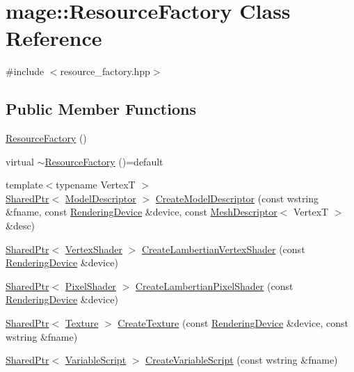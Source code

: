 \hypertarget{classmage_1_1_resource_factory}{}\section{mage\+:\+:Resource\+Factory Class Reference}
\label{classmage_1_1_resource_factory}


{\ttfamily \#include $<$resource\+\_\+factory.\+hpp$>$}

\subsection*{Public Member Functions}
\begin{DoxyCompactItemize}
\item 
\hyperlink{classmage_1_1_resource_factory_a340bde81096427e319b60063ae771a0d}{Resource\+Factory} ()
\item 
virtual \hyperlink{classmage_1_1_resource_factory_a07b50ac86226772e3c7d119ff9e10043}{$\sim$\+Resource\+Factory} ()=default
\item 
{\footnotesize template$<$typename VertexT $>$ }\\\hyperlink{namespacemage_a1e01ae66713838a7a67d30e44c67703e}{Shared\+Ptr}$<$ \hyperlink{classmage_1_1_model_descriptor}{Model\+Descriptor} $>$ \hyperlink{classmage_1_1_resource_factory_a04e226be9c659dc33d263dc82a2a1a30}{Create\+Model\+Descriptor} (const wstring \&fname, const \hyperlink{classmage_1_1_rendering_device}{Rendering\+Device} \&device, const \hyperlink{structmage_1_1_mesh_descriptor}{Mesh\+Descriptor}$<$ VertexT $>$ \&desc)
\item 
\hyperlink{namespacemage_a1e01ae66713838a7a67d30e44c67703e}{Shared\+Ptr}$<$ \hyperlink{classmage_1_1_vertex_shader}{Vertex\+Shader} $>$ \hyperlink{classmage_1_1_resource_factory_af5771b81adf517c1ff174252994e02b9}{Create\+Lambertian\+Vertex\+Shader} (const \hyperlink{classmage_1_1_rendering_device}{Rendering\+Device} \&device)
\item 
\hyperlink{namespacemage_a1e01ae66713838a7a67d30e44c67703e}{Shared\+Ptr}$<$ \hyperlink{classmage_1_1_pixel_shader}{Pixel\+Shader} $>$ \hyperlink{classmage_1_1_resource_factory_aa547e0dac336a2ac48eb92d399d929be}{Create\+Lambertian\+Pixel\+Shader} (const \hyperlink{classmage_1_1_rendering_device}{Rendering\+Device} \&device)
\item 
\hyperlink{namespacemage_a1e01ae66713838a7a67d30e44c67703e}{Shared\+Ptr}$<$ \hyperlink{classmage_1_1_texture}{Texture} $>$ \hyperlink{classmage_1_1_resource_factory_a82dd7f58c91625cb261fa41ddbeefaec}{Create\+Texture} (const \hyperlink{classmage_1_1_rendering_device}{Rendering\+Device} \&device, const wstring \&fname)
\item 
\hyperlink{namespacemage_a1e01ae66713838a7a67d30e44c67703e}{Shared\+Ptr}$<$ \hyperlink{classmage_1_1_variable_script}{Variable\+Script} $>$ \hyperlink{classmage_1_1_resource_factory_ac2e3dd6732fa2c2f9a4f27e587fe416c}{Create\+Variable\+Script} (const wstring \&fname)
\end{DoxyCompactItemize}
